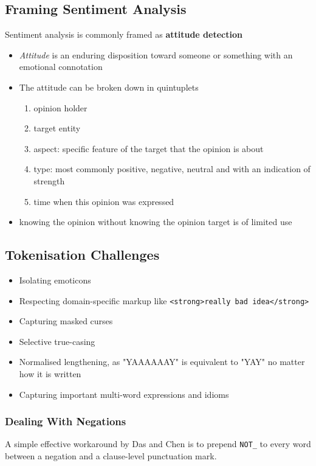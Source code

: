 \documentclass[11pt]{article}
\begin{document}
\subsection{Framing Sentiment Analysis}
Sentiment analysis is commonly framed as \textbf{attitude detection}
\begin{itemize}
	\item \emph{Attitude} is an enduring disposition toward someone or something with an emotional connotation
	\item The attitude can be broken down in quintuplets
	\begin{enumerate}
		\item opinion holder
		\item target entity
		\item aspect: specific feature of the target that the opinion is about
		\item type: most commonly {\color{Green3} positive}, {\color{Firebrick3} negative}, {\color{gray} neutral} and with an indication of strength
		\item time when this opinion was expressed
	\end{enumerate}
	\item knowing the opinion without knowing the opinion target is of limited use
\end{itemize}

\subsection{Tokenisation Challenges}
\begin{itemize}
	\item Isolating emoticons
	\item Respecting domain-specific markup like \texttt{<strong>really bad idea</strong>}
	\item Capturing masked curses
	\item Selective true-casing
	\item Normalised lengthening, as "YAAAAAAY" is equivalent to "YAY" no matter how it is written
	\item Capturing important multi-word expressions and idioms
\end{itemize}

\subsubsection{Dealing With Negations}
A simple effective workaround by Das and Chen is to prepend \texttt{NOT\_} to every word between a negation and a clause-level punctuation mark.
\end{document}
